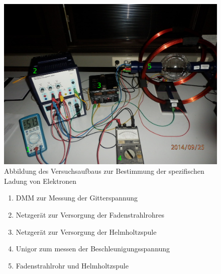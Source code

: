\documentclass[12pt,a4paper]{article}
\begin{document}
\begin{figure}[H] 
  \centering
    \includegraphics[scale = 0.3]{aufbau_h.pdf}
  	\caption[Abbildung des Versuchsaufbaus zur Bestimmung der spezifischen Ladung von Elektronen]{Abbildung des Versuchsaufbaus zur Bestimmung der spezifischen Ladung von Elektronen}
  \label{fig:aufbau_h}
\end{figure}

\begin{figure}
\begin{enumerate}
\item	DMM zur Messung der Gitterspannung

\item	Netzgerät zur Versorgung der Fadenstrahlrohres

\item	Netzgerät zur Versorgung der Helmholtzspule

\item	Unigor zum messen der Beschleunigungsspannung

\item	Fadenstrahlrohr und Helmholtzspule
\end{enumerate}
\end{figure}
\end{document}
